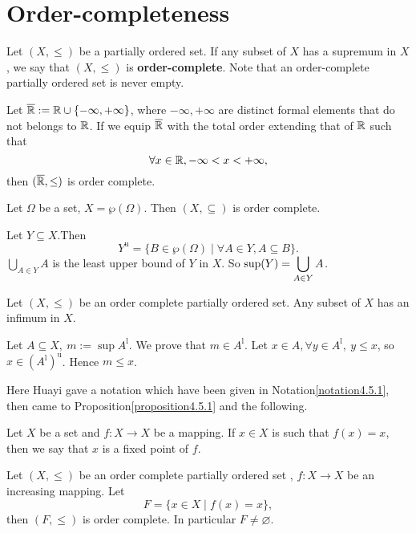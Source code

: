 \section{Order-completeness}
\begin{definitionenv}\label{4.8.1}
    Let $(X, \le)$ be a partially ordered set. If any subset of $X$ has a supremum in $X$,  we say that  $(X,  \le)$ is \textbf{order-complete}. Note that an order-complete
partially ordered set is never empty.
\end{definitionenv}
\begin{axiomenv}
    Let $\overline{\mathbb{R}}:=\mathbb{R}\cup\{-\infty, +\infty\}$,  where $-\infty, +\infty$ are distinct formal elements that do not belongs to $\mathbb{R}$. If we equip $\overline{\mathbb{R}}$ with the total order extending that of $\mathbb{R}$ such that 
    $$\forall x\in \mathbb{R}, -\infty<x<+\infty, $$ 
    then $(\overline{\mathbb{R}}, \le)$ is order complete.
\end{axiomenv}
\begin{exampleenv}
    Let $\Omega$ be a set, $X=\wp(\Omega)$. Then $(X, \subseteq)$ is  order complete.
\end{exampleenv}
    \begin{proofenv}
        Let $Y\subseteq X$.Then 
        $$Y^{\mathrm{u}}=\{B\in\wp(\Omega)\mid \forall A\in Y, A\subseteq B\}.$$
        $\displaystyle \bigcup_{A\in Y}A$ is the least upper bound of $Y$ in $X$. So $\displaystyle \sup (Y)=\bigcup_{A\in Y}A$.
    \end{proofenv}
\begin{propositionenv}
    Let $(X, \le)$ be an order complete partially ordered set. Any subset of $X$ has an infimum in $X$.
\end{propositionenv}
\begin{proofenv}
    Let $A\subseteq X,\  m:=\sup A^\mathrm{l}$. We prove that $m\in A^\mathrm{l}$.
    \newline
    Let $x\in A, \forall y \in A^\mathrm{l},\  y\le x $,  so $x\in (A^\mathrm{l})^\mathrm{u}$. Hence $m\le x$.
\end{proofenv}
Here Huayi gave a notation which have been given in Notation\ref{notation4.5.1}, then came to Proposition\ref{proposition4.5.1} and the following.
\begin{definitionenv}
    Let $X$ be a set and $f:X\rightarrow X$ be a mapping. If $x\in X $ is such that $f(x)=x$,  then we say that $x$ is a fixed point of $f$. 
\end{definitionenv}
\begin{theoremenv}
    \quad
    \newline
    Let $(X, \le)$ be an order complete partially ordered set , $f:X\rightarrow X$ be an increasing mapping. Let 
    $$F=\{x\in X\mid f(x)=x\}, $$
    then $(F, \le)$ is order complete. In particular $F\not=\varnothing$.
    
\end{theoremenv}

